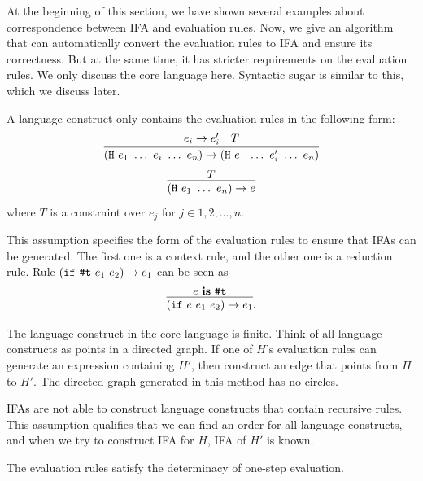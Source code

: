 At the beginning of this section, we have shown several examples about correspondence between IFA and evaluation rules. Now, we give an algorithm that can automatically convert the evaluation rules to IFA and ensure its correctness. But at the same time, it has stricter requirements on the evaluation rules. We only discuss the core language here. Syntactic sugar is similar to this, which we discuss later.


\begin{Asm}
    \label{Asm:rules}
    A language construct  only contains the evaluation rules in the following form:
    \[
        \infer
        {(\m{H}~e_1~\ldots~e_i~\ldots~e_n) \to (\m{H}~e_1~\ldots~e_i'~\ldots~e_n)}{e_i \to e_i'\quad T}
    \]
    \[
        \infer{(\m{H}~e_1~\ldots~e_n) \to e}{T}
    \]
    where $T$ is a constraint over $e_j$ for $j \in 1,2,\ldots,n$.
\end{Asm}

This assumption specifies the form of the evaluation rules to ensure that IFAs can be generated. The first one is a context rule, and the other one is a reduction rule. Rule $(\mbox{\tt if}~\mbox{\tt \#t}~e_1~e_2) \to e_1$ can be seen as \[\infer{(\m{if}~e~e_1~e_2) \to e_1}{e~\key{is}~\m{\#t}}.\]

\begin{Asm}
    \label{Asm:orderliness}
    The language construct in the core language is finite. Think of all language constructs as points in a directed graph. If one of $H$'s evaluation rules can generate an expression containing $H'$, then construct an edge that points from $H$ to $H'$. The directed graph generated in this method has no circles.
\end{Asm}

IFAs are not able to construct language constructs that contain recursive rules. This assumption qualifies that we can find an order for all language constructs, and when we try to construct IFA for $H$, IFA of $H'$ is known.

\begin{Asm}
    \label{Asm:determinacy}
    The evaluation rules satisfy the determinacy of one-step evaluation.
\end{Asm}

